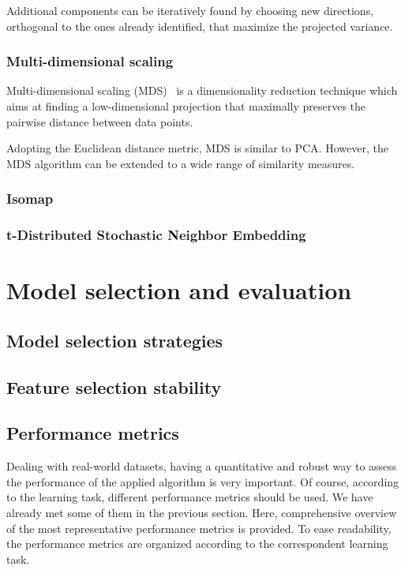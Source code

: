 	Additional components can be iteratively found by choosing new directions, orthogonal to the ones already identified, that maximize the projected variance.
	
	\subsubsection{Multi-dimensional scaling} \label{sec:mds}

	Multi-dimensional scaling (\ac{MDS})~\cite{bishop2006pattern} is a dimensionality reduction technique which aims at finding a low-dimensional projection that maximally preserves the pairwise distance between data points.
		
	Adopting the Euclidean distance metric, MDS is similar to PCA. However, the MDS algorithm can be extended to a wide range of similarity measures.
	
	\subsubsection{Isomap} \label{sec:isomap}
	
	\subsubsection{t-Distributed Stochastic Neighbor Embedding} \label{sec:tsne}
    
    


  \section{Model selection and evaluation} \label{subsec:model_selection}
    \subsection{Model selection strategies}
    \subsection{Feature selection stability}
    \subsection{Performance metrics} \label{sec:performance_metrics}
    Dealing with real-world datasets, having a quantitative and robust way to assess the performance of the applied algorithm is very important. Of course, according to the learning task, different performance metrics should be used. We have already met some of them in the previous section. Here, comprehensive overview of the most representative performance metrics is provided. To ease readability, the performance metrics are organized according to the correspondent learning task.
    
